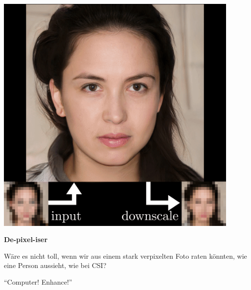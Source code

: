 \documentclass[aspectratio=169,usenames,dvipsnames]{beamer}
\begin{document}
\begin{frame}
\begin{minipage}{.5\textwidth}
\includegraphics[width=0.9\textwidth, keepaspectratio]{images/step8}
\end{minipage}\begin{minipage}{.5\textwidth}
\textbf{De-pixel-iser}
\bigskip

Wäre es nicht toll, wenn wir aus einem stark verpixelten Foto raten könnten, wie eine Person aussieht, wie bei CSI?
\bigskip

``Computer! Enhance!''
\end{minipage}
\end{frame}
\end{document}
